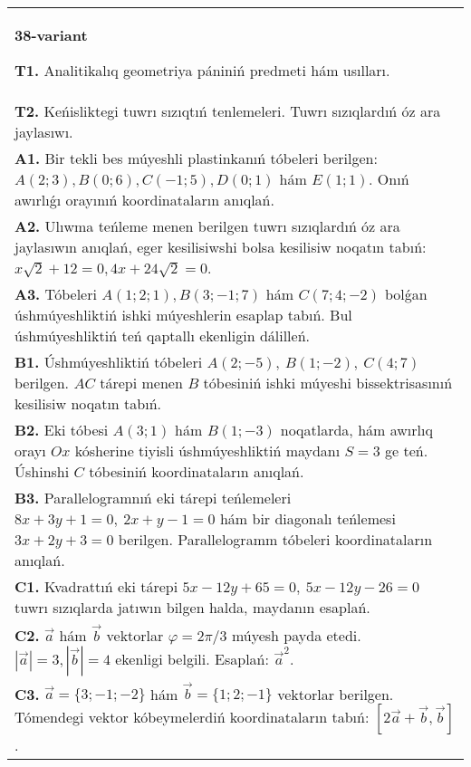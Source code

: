 \documentclass{article}
\begin{document}
\begin{tabular}{m{17cm}}
\textbf{38-variant}

\textbf{T1.} Analitikalıq geometriya pániniń predmeti hám usılları.
 \\
\textbf{T2.} 
Keńisliktegi tuwrı sızıqtıń tenlemeleri. Tuwrı sızıqlardıń óz ara jaylasıwı.
 \\
\textbf{A1.} 
Bir tekli bes múyeshli plastinkanıń tóbeleri berilgen:
$A (2;3), B (0;6), C (-1;5), D (0;1) $ hám $E (1;1) $. Onıń awırlıǵı
orayınıń koordinataların anıqlań.
 \\
\textbf{A2.} 
Ulıwma teńleme menen berilgen tuwrı sızıqlardıń
óz ara jaylasıwın anıqlań, eger kesilisiwshi bolsa kesilisiw noqatın
tabıń: $x\sqrt{2}+12=0, 4x+24\sqrt{2}=0$.
 \\
\textbf{A3.} 
Tóbeleri $A (1;2;1), B (3;-1;7) $ hám $C (7;4;-2) $ bolǵan úshmúyeshliktiń
ishki múyeshlerin esaplap tabıń. Bul úshmúyeshliktiń teń qaptallı ekenligin dálilleń.
 \\
\textbf{B1.} 
Úshmúyeshliktiń tóbeleri \(A (2;-5),\ B (1;-2),\ C (4;7) \)
berilgen. $AC$ tárepi menen $B$ tóbesiniń ishki múyeshi
bissektrisasınıń kesilisiw noqatın tabıń.
 \\
\textbf{B2.} 
Eki tóbesi \(A (3;1) \) hám \(B (1;-3) \) noqatlarda, hám
awırlıq orayı $Ox$ kósherine tiyisli úshmúyeshliktiń maydanı
\(S=3\) ge teń. Úshinshi $C$ tóbesiniń koordinataların anıqlań.
 \\
\textbf{B3.} 
Parallelogramnıń eki tárepi teńlemeleri
\(8x+3y+1=0,\ 2x+y-1=0\) hám bir diagonalı teńlemesi
\(3x+2y+3=0\) berilgen. Parallelogramm tóbeleri koordinataların
anıqlań.
 \\
\textbf{C1.} 
Kvadrattıń eki tárepi
\(5x-12y+65=0,\ 5x-12y-26=0\) tuwrı sızıqlarda
jatıwın bilgen halda, maydanın esaplań.
 \\
\textbf{C2.} 
$\vec{a}$ hám $\vec{b}$ vektorlar $\varphi = 2\pi/3$ múyesh payda etedi. $|\vec{a}| = 3,|\vec{b}| = 4$ ekenligi belgili. Esaplań:
${\vec{a}}^{2}$.
 \\
\textbf{C3.} 
$\vec{a} = \{ 3; - 1; - 2\}$ hám $\vec{b} = \{ 1;2; - 1\}$ vektorlar berilgen. Tómendegi vektor kóbeymelerdiń koordinataların tabıń:
$\left\lbrack 2\vec{a} + \vec{b},\vec{b} \right\rbrack$.
 \\

\end{tabular}
\vspace{1cm}
\end{document}
